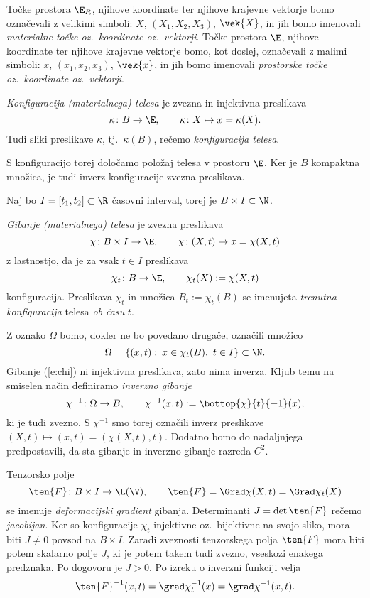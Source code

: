 Točke prostora $\E_R$, njihove koordinate ter njihove krajevne vektorje bomo označevali
z velikimi simboli: $X$, $(X_1,X_2,X_3)$, $\vek{X}$, in jih bomo imenovali
\emph{materialne točke oz.~koordinate oz.~vektorji}.
Točke prostora $\E$, njihove koordinate ter njihove krajevne vektorje bomo,
kot doslej, označevali z malimi simboli: $x$, $(x_1,x_2,x_3)$, $\vek{x}$, in jih bomo imenovali
\emph{prostorske točke oz.~koordinate oz.~vektorji}.

\begin{definicija}
	\emph{Konfiguracija (materialnega) telesa} je zvezna in injektivna preslikava
	\[ \kappa\colon B\to\E,\qquad \kappa\colon X\mapsto x=\kappa(X). \]
	Tudi sliki preslikave $\kappa$, tj.~$\kappa(B)$, rečemo \emph{konfiguracija telesa}.
\end{definicija}
S konfiguracijo torej določamo položaj telesa v prostoru $\E$. Ker je $B$ kompaktna
množica, je tudi inverz konfiguracije zvezna preslikava.

Naj bo $I=[t_1,t_2]\subset\R$ časovni interval, torej je $B\times I\subset\N$.
\begin{definicija}
	\emph{Gibanje (materialnega) telesa} je zvezna preslikava
	\begin{equation}\label{e:chi}
		\chi\colon B\times I\to\E,\qquad \chi\colon(X,t)\mapsto x=\chi(X,t)
	\end{equation}
	z lastnostjo, da je za vsak $t\in I$ preslikava
	\[ \chi_t\colon B\to\E, \qquad \chi_t(X):=\chi(X,t) \]
	konfiguracija. Preslikava $\chi_t$ in množica $ B_t:=\chi_t(B)$ se imenujeta
	\emph{trenutna konfiguracija} telesa \emph{ob času} $t$.
\end{definicija}

Z oznako $\Omega$ bomo, dokler ne bo povedano drugače, označili množico
\[ \Omega=\{(x,t)\;;\ x\in\chi_t(B),\ t\in I\}\subset\N. \]
Gibanje (\ref{e:chi}) ni injektivna preslikava, zato nima inverza. Kljub temu na smiselen
način definiramo \emph{inverzno gibanje}
\[
	\chi^{-1}\colon\Omega\to B,\qquad
	\chi^{-1}(x,t):=\bottop{\chi}{t}{-1}(x),
\]
ki je tudi zvezno. S $\chi^{-1}$ smo torej označili inverz preslikave
$(X,t)\mapsto(x,t)=(\chi(X,t),t)$. Dodatno bomo do nadaljnjega predpostavili, da sta gibanje
in inverzno gibanje razreda $C^2$.

Tenzorsko polje
\[
	\ten{F}\colon B\times I\to\L(\V),\qquad \ten{F}=\Grad\chi(X,t)=\Grad\chi_t(X)
\]
se imenuje \emph{deformacijski gradient} gibanja. Determinanti $J=\det\ten{F}$ 
rečemo \emph{jacobijan}. Ker so konfiguracije $\chi_t$
injektivne oz.~bijektivne na svojo sliko, mora biti $J\neq 0$ povsod na $B\times I$.
Zaradi zveznosti tenzorskega polja $\ten{F}$ mora biti potem skalarno polje $J$,
ki je potem takem tudi zvezno, vseskozi
enakega predznaka. Po dogovoru je $J>0$. Po izreku o inverzni funkciji velja
\[
	\ten{F}^{-1}(x,t)=\grad\chi_t^{-1}(x)=\grad\chi^{-1}(x,t).
\]


